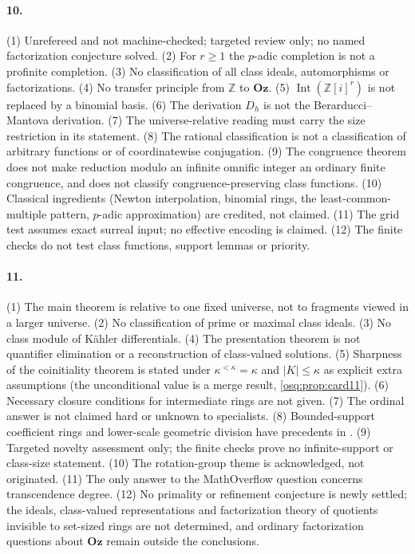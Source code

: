 \documentclass[11pt,letterpaper]{article}
\numberwithin{equation}{section}
\theoremstyle{definition}
\theoremstyle{remark}
\theoremstyle{plain}
\newcommand{\Oz}{\mathbf{Oz}}
\newcommand{\Z}{\mathbb Z}
\newcommand{\Int}{\operatorname{Int}}
\begin{document}
\paragraph{10.} (1) Unrefereed and not machine-checked; targeted review only; no named factorization
conjecture solved. (2) For $r\ge1$ the $p$-adic completion is not a profinite completion. (3) No
classification of all class ideals, automorphisms or factorizations. (4) No transfer principle from
$\Z$ to $\Oz$. (5) $\Int(\Z[i]^r)$ is not replaced by a binomial basis. (6) The derivation $D_h$ is not the
Berarducci--Mantova derivation. (7) The universe-relative reading must carry the size restriction in
its statement. (8) The rational classification is not a classification of arbitrary functions or of
coordinatewise conjugation. (9) The congruence theorem does not make reduction modulo an infinite
omnific integer an ordinary finite congruence, and does not classify congruence-preserving class
functions. (10) Classical ingredients (Newton interpolation, binomial rings, the least-common-multiple
pattern, $p$-adic approximation) are credited, not claimed. (11) The grid test assumes exact surreal
input; no effective encoding is claimed. (12) The finite checks do not test class functions, support
lemmas or priority.

\paragraph{11.} (1) The main theorem is relative to one fixed universe, not to fragments viewed in a
larger universe. (2) No classification of prime or maximal class ideals. (3) No class module of
K\"ahler differentials. (4) The presentation theorem is not quantifier elimination or a
reconstruction of class-valued solutions. (5) Sharpness of the coinitiality theorem is stated under
$\kappa^{<\kappa}=\kappa$ and $|K|\le\kappa$ as explicit extra assumptions (the unconditional value is a
merge result, \cref{osq:prop:card11}). (6) Necessary closure conditions for intermediate rings are not
given. (7) The ordinal answer is not claimed hard or unknown to specialists. (8) Bounded-support
coefficient rings and lower-scale geometric division have precedents in \cite[Section~8]{LM}.
(9) Targeted novelty assessment only; the finite checks prove no infinite-support or class-size
statement. (10) The rotation-group theme is acknowledged, not originated. (11) The only answer to
the MathOverflow question concerns transcendence degree. (12) No primality or refinement conjecture is
newly settled; the ideals, class-valued representations and factorization theory of quotients invisible
to set-sized rings are not determined, and ordinary factorization questions about $\Oz$ remain
outside the conclusions.
\end{document}
